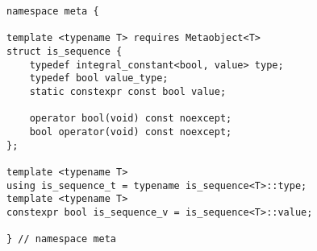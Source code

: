 
\begin{verbatim}
namespace meta {

template <typename T> requires Metaobject<T>
struct is_sequence {
	typedef integral_constant<bool, value> type;
	typedef bool value_type;
	static constexpr const bool value;

	operator bool(void) const noexcept;
	bool operator(void) const noexcept;
};

template <typename T>
using is_sequence_t = typename is_sequence<T>::type;
template <typename T>
constexpr bool is_sequence_v = is_sequence<T>::value;

} // namespace meta
\end{verbatim}
